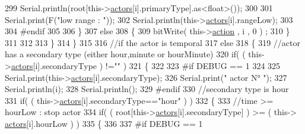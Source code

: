 \begin{DoxyCode}
299                             Serial.println(root[this->\hyperlink{class_jetpack_a7e16d2f97837f9712a2e6de1c50d99db}{actors}[i].primaryType].as<float>());
300 
301                             Serial.print(F(\textcolor{stringliteral}{"low range : "}));
302                             Serial.println(this->\hyperlink{class_jetpack_a7e16d2f97837f9712a2e6de1c50d99db}{actors}[i].rangeLow);
303                         
304 \textcolor{preprocessor}{                        #endif}
305                                             
306                         \}
307                         \textcolor{keywordflow}{else} 
308                         \{
309                             bitWrite( this->\hyperlink{class_jetpack_aca3142925a7b0834b34ae91d26af7765}{action} , i , 0 ) ;                        
310                         \}
311 
312                     
313                     \}
314                 \}
315 
316                 \textcolor{comment}{//if the actor is temporal}
317                 \textcolor{keywordflow}{else}
318                 \{
319                     \textcolor{comment}{//actor has a secondary type (either hour,minute or hourMinute)}
320                     \textcolor{keywordflow}{if}( ( this->\hyperlink{class_jetpack_a7e16d2f97837f9712a2e6de1c50d99db}{actors}[i].secondaryType ) !=\textcolor{stringliteral}{""} )  
321                     \{
322                     
323 \textcolor{preprocessor}{                    #if DEBUG == 1}
324                         
325                         Serial.print(this->\hyperlink{class_jetpack_a7e16d2f97837f9712a2e6de1c50d99db}{actors}[i].secondaryType);
326                         Serial.print(\textcolor{stringliteral}{" actor N° "});
327                         Serial.println(i);
328                         Serial.println();
329 \textcolor{preprocessor}{                    #endif}
330                         \textcolor{comment}{//secondary type is hour    }
331                         \textcolor{keywordflow}{if}( ( this->\hyperlink{class_jetpack_a7e16d2f97837f9712a2e6de1c50d99db}{actors}[i].secondaryType==\textcolor{stringliteral}{"hour"} ) )
332                         \{
333                             \textcolor{comment}{//time >= hourLow : stop actor}
334                             \textcolor{keywordflow}{if}( ( root[this->\hyperlink{class_jetpack_a7e16d2f97837f9712a2e6de1c50d99db}{actors}[i].secondaryType] ) >= ( this->
      \hyperlink{class_jetpack_a7e16d2f97837f9712a2e6de1c50d99db}{actors}[i].hourLow ) )     
335                             \{
336                         
337 \textcolor{preprocessor}{                            #if DEBUG == 1 }

\end{DoxyCode}
